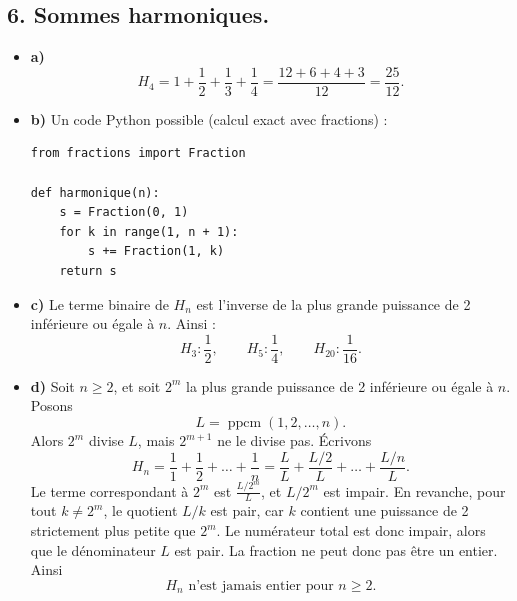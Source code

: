 \subsection*{6. Sommes harmoniques.}
\begin{itemize}
    \item \textbf{a)} 
    \[H_4 = 1 + \frac{1}{2} + \frac{1}{3} + \frac{1}{4} = \frac{12 + 6 + 4 + 3}{12} = \frac{25}{12}.\]

    \item \textbf{b)} Un code Python possible (calcul exact avec fractions) :
    \begin{verbatim}
from fractions import Fraction

def harmonique(n):
    s = Fraction(0, 1)
    for k in range(1, n + 1):
        s += Fraction(1, k)
    return s
\end{verbatim}

    \item \textbf{c)} Le terme binaire de \(H_n\) est l'inverse de la plus grande puissance de 2 inférieure ou égale à \(n\). Ainsi :
    \[H_3 : \frac{1}{2},\qquad H_5 : \frac{1}{4},\qquad H_{20} : \frac{1}{16}.\]

    \item \textbf{d)} Soit \(n \geqslant 2\), et soit \(2^m\) la plus grande puissance de 2 inférieure ou égale à \(n\). Posons
    \[L = \operatorname{ppcm}(1, 2, \dots, n).\]
    Alors \(2^m\) divise \(L\), mais \(2^{m+1}\) ne le divise pas. Écrivons
    \[H_n = \frac{1}{1} + \frac{1}{2} + \dots + \frac{1}{n} = \frac{L}{L} + \frac{L/2}{L} + \dots + \frac{L/n}{L}.\]
    Le terme correspondant à \(2^m\) est \(\frac{L/2^m}{L}\), et \(L/2^m\) est impair. En revanche, pour tout \(k \neq 2^m\), le quotient \(L/k\) est pair, car \(k\) contient une puissance de 2 strictement plus petite que \(2^m\). Le numérateur total est donc impair, alors que le dénominateur \(L\) est pair. La fraction ne peut donc pas être un entier. Ainsi
    \[\boxed{H_n \text{ n'est jamais entier pour } n \geqslant 2.}\]
\end{itemize}
